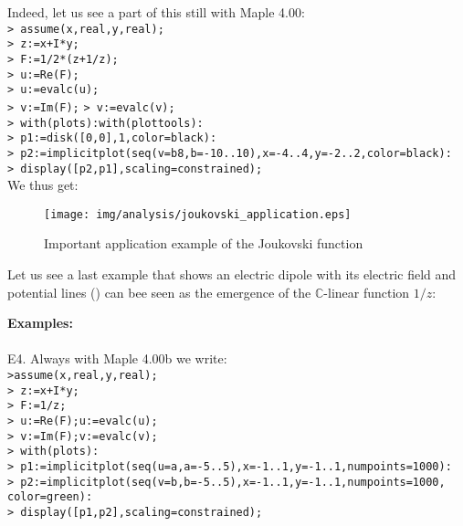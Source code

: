 	\pagebreak
	\begin{tcolorbox}[colframe=black,colback=white,sharp corners]
Indeed, let us see a part of this still with Maple 4.00:\\

\texttt{> assume(x,real,y,real);}\\
\texttt{> z:=x+I*y;}\\
\texttt{> F:=1/2*(z+1/z);}\\
\texttt{> u:=Re(F);}\\
\texttt{> u:=evalc(u);}\\
\texttt{> v:=Im(F);}
\texttt{> v:=evalc(v);}\\
\texttt{> with(plots):with(plottools):}\\
\texttt{> p1:=disk([0,0],1,color=black):}\\
\texttt{> p2:=implicitplot({seq(v=b8,b=-10..10)},x=-4..4,y=-2..2,color=black):}\\
\texttt{> display([p2,p1],scaling=constrained);}\\

We thus get:

	\begin{figure}[H]
		\begin{center}
			\texttt{[image: img/analysis/joukovski\_application.eps]}
		\end{center}	
		\caption{Important application example of the Joukovski function}
	\end{figure}

	\end{tcolorbox}

Let us see a last example that shows an electric dipole with its electric field and potential lines () can bee seen as the emergence of the $\mathbb{C}$-linear function $1/z$:

	\begin{tcolorbox}[colframe=black,colback=white,sharp corners]
\textbf{{\Large {}}Examples:}\\\\
E4. Always with Maple 4.00b we write:\\

\texttt{>assume(x,real,y,real);}\\
\texttt{> z:=x+I*y;}\\
\texttt{> F:=1/z;}\\
\texttt{> u:=Re(F);u:=evalc(u);}\\
\texttt{> v:=Im(F);v:=evalc(v);}\\
\texttt{> with(plots):}\\
\texttt{> p1:=implicitplot({seq(u=a,a=-5..5)},x=-1..1,y=-1..1,numpoints=1000):}\\
\texttt{> p2:=implicitplot({seq(v=b,b=-5..5)},x=-1..1,y=-1..1,numpoints=1000,}\\
\texttt{color=green):}\\
\texttt{> display([p1,p2],scaling=constrained);}\\
	\end{tcolorbox}
	
